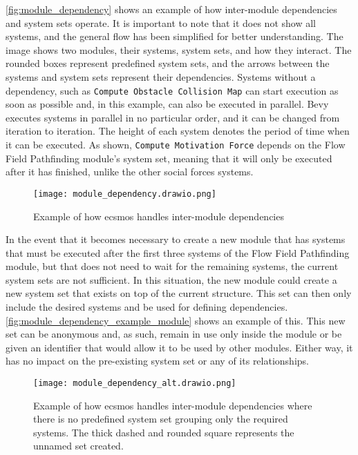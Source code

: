 \documentclass[twoside, 11pt]{article}
\begin{document}
\autoref{fig:module_dependency} shows an example of how inter-module dependencies and system sets operate. It is important to note that it does not show all systems, and the general flow has been simplified for better understanding. The image shows two modules, their systems, system sets, and how they interact. The rounded boxes represent predefined system sets, and the arrows between the systems and system sets represent their dependencies. Systems without a dependency, such as \verb|Compute Obstacle Collision Map| can start execution as soon as possible and, in this example, can also be executed in parallel. Bevy executes systems in parallel in no particular order, and it can be changed from iteration to iteration. The height of each system denotes the period of time when it can be executed. As shown, \verb|Compute Motivation Force| depends on the Flow Field Pathfinding module's system set, meaning that it will only be executed after it has finished, unlike the other social forces systems.

\begin{figure}[h]
  \centering
  \texttt{[image: module\_dependency.drawio.png]}
  \caption[Example of how ECSMoS handles inter-module dependencies]{Example of how \gls{ecsmos} handles inter-module dependencies}
  \label{fig:module_dependency}
\end{figure}

In the event that it becomes necessary to create a new module that has systems that must be executed after the first three systems of the Flow Field Pathfinding module, but that does not need to wait for the remaining systems, the current system sets are not sufficient. In this situation, the new module could create a new system set that exists on top of the current structure. This set can then only include the desired systems and be used for defining dependencies. 
\autoref{fig:module_dependency_example_module} shows an example of this. This new set can be anonymous and, as such, remain in use only inside the module or be given an identifier that would allow it to be used by other modules. Either way, it has no impact on the pre-existing system set or any of its relationships.

\begin{figure}[h]
  \centering
  \texttt{[image: module\_dependency\_alt.drawio.png]}
  \caption[Example of how ECSMoS handles the addition of systems with dependencies]{Example of how \gls{ecsmos} handles inter-module dependencies where there is no predefined system set grouping only the required systems. The thick dashed and rounded square represents the unnamed set created.}
  \label{fig:module_dependency_example_module}
\end{figure}
\end{document}
